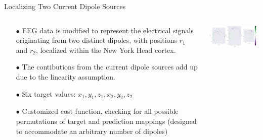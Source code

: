 \documentclass[aspectratio=169, 9pt]{beamer}
\begin{document}
\begin{frame}{Localizing Two Current Dipole Sources}
  \begin{columns}
    \begin{column}{0.5\textwidth}
      \begin{itemize}
        \item[$\bullet$] EEG data is modified to represent the electrical signals originating from two distinct dipoles, with positions $r_1$ and $r_2$, localized within the New York Head cortex.
        \item[$\bullet$] The contibutions from the current dipole sources add up due to the linearity assumption.
        \item[$\bullet$] Six target values: $x_1, y_1, z_1, x_2, y_2, z_2$
        \item[$\bullet$] Customized cost function, checking for all possible permutations of target and prediction mappings (designed to accommodate an arbitrary number of dipoles)
    \end{itemize}
    \end{column}
    \begin{column}{0.5\textwidth}
    \includegraphics[width=7cm]{figures/dipoles_w_amplitudes_eeg_field_2_20.pdf}
    \end{column}
  \end{columns}
\end{frame}
\end{document}
